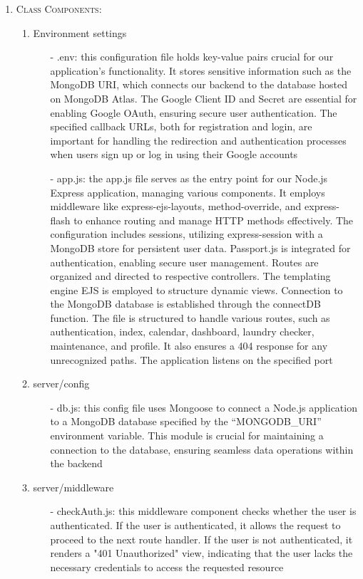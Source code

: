 \documentclass[conference]{IEEEtran}
\begin{document}
\begin{enumerate}
    \item \textsc{Class Components:} \begin{enumerate}
        \item Environment settings
        \begin{itemize}
            \item[-] .env: this configuration file holds key-value pairs crucial for our application's functionality. It stores sensitive information such as the MongoDB URI, which connects our backend to the database hosted on MongoDB Atlas. The Google Client ID and Secret are essential for enabling Google OAuth, ensuring secure user authentication. The specified callback URLs, both for registration and login, are important for handling the redirection and authentication processes when users sign up or log in using their Google accounts
            \item[-] app.js: the app.js file serves as the entry point for our Node.js Express application, managing various components. It employs middleware like express-ejs-layouts, method-override, and express-flash to enhance routing and manage HTTP methods effectively. The configuration includes sessions, utilizing express-session with a MongoDB store for persistent user data. Passport.js is integrated for authentication, enabling secure user management. Routes are organized and directed to respective controllers. The templating engine EJS is employed to structure dynamic views. Connection to the MongoDB database is established through the connectDB function. The file is structured to handle various routes, such as authentication, index, calendar, dashboard, laundry checker, maintenance, and profile. It also ensures a 404 response for any unrecognized paths. The application listens on the specified port
        \end{itemize}
        
        \item server/config
        \begin{itemize}
            \item[-] db.js: this config file uses Mongoose to connect a Node.js application to a MongoDB database specified by the “MONGODB\_URI” environment variable. This module is crucial for maintaining a connection to the database, ensuring seamless data operations within the backend
        \end{itemize}

        \item server/middleware
        \begin{itemize}
            \item[-] checkAuth.js: this middleware component checks whether the user is authenticated. If the user is authenticated, it allows the request to proceed to the next route handler. If the user is not authenticated, it renders a "401 Unauthorized" view, indicating that the user lacks the necessary credentials to access the requested resource
        \end{itemize}


\end{enumerate}
\end{enumerate}
\end{document}
